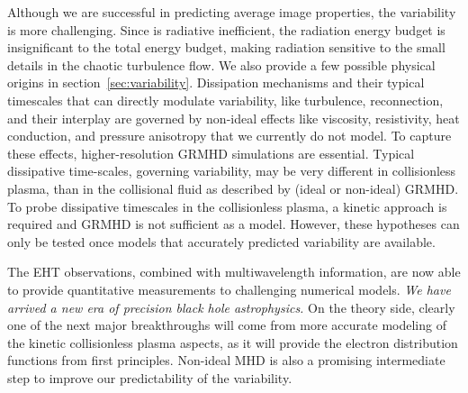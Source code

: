 Although we are successful in predicting average image properties, the
variability is more challenging.
Since \sgra is radiative inefficient, the radiation energy budget is
insignificant to the total energy budget, making radiation sensitive
to the small details in the chaotic turbulence flow.
We also provide a few possible physical origins in
section~\ref{sec:variability}.
Dissipation mechanisms and their typical timescales that can directly modulate variability, like turbulence, reconnection, and their interplay are governed by non-ideal effects like viscosity, resistivity, heat conduction, and pressure anisotropy that we currently do not model. To capture these effects, higher-resolution GRMHD simulations are essential.
Typical dissipative time-scales, governing variability, may be very different in collisionless plasma, than in the collisional fluid as described by (ideal or non-ideal) GRMHD. To probe dissipative timescales in the collisionless plasma, a kinetic approach is required and GRMHD is not sufficient as a model.
However, these hypotheses can only be tested once models that
accurately predicted variability are available.

The EHT observations, combined with multiwavelength information, are
now able to provide quantitative measurements to challenging numerical
models.
\emph{We have arrived a new era of precision black hole astrophysics.}
On the theory side, clearly one of the next major breakthroughs will
come from more accurate modeling of the kinetic collisionless plasma aspects,
as it will provide the electron distribution functions from first principles.
Non-ideal MHD is also a promising intermediate step to improve our
predictability of the variability.
